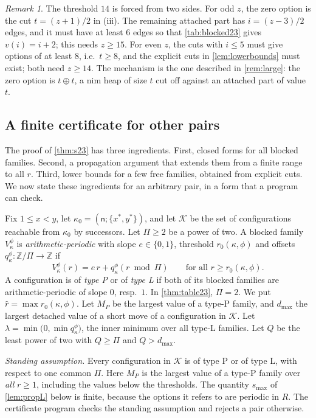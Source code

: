 \documentclass[11pt]{amsart}
\theoremstyle{definition}
\theoremstyle{remark}
\newtheorem{remark}[theorem]{Remark}
\newcommand{\sn}{\mathsf{n}}
\newcommand{\free}{\ast}
\begin{document}
\begin{remark}
The threshold $14$ is forced from two sides. For odd $z$, the zero option is the cut $t=(z+1)/2$ in (iii). The remaining attached part has $i=(z-3)/2$ edges, and it must have at least $6$ edges so that \cref{tab:blocked23} gives $v(i)=i+2$; this needs $z\ge15$. For even $z$, the cuts with $i\le5$ must give options of at least $8$, i.e.\ $t\ge8$, and the explicit cuts in \cref{lem:lowerbounds} must exist; both need $z\ge14$. The mechanism is the one described in \cref{rem:large}: the zero option is $t\oplus t$, a nim heap of size $t$ cut off against an attached part of value~$t$.
\end{remark}


\subsection{A finite certificate for other pairs}\label{sec:cert}
The proof of \cref{thm:s23} has three ingredients. First, closed forms for all blocked families. Second, a propagation argument that extends them from a finite range to all $r$. Third, lower bounds for a few free families, obtained from explicit cuts. We now state these ingredients for an arbitrary pair, in a form that a program can check.

Fix $1\le x<y$, let $\kappa_0=(\sn;\{x^\free,y^\free\})$, and let $\mathcal K$ be the set of configurations reachable from $\kappa_0$ by successors. Let $\Pi\ge2$ be a power of two. A blocked family $V^\phi_\kappa$ is \emph{arithmetic-periodic} with slope $e\in\{0,1\}$, threshold $r_0(\kappa,\phi)$ and offsets $q^\phi_\kappa\colon\mathbb Z/\Pi\to\mathbb Z$ if
\[
  V^\phi_\kappa(r)=e\,r+q^\phi_\kappa(r\bmod\Pi)\qquad\text{for all }r\ge r_0(\kappa,\phi).
\]
A configuration is of \emph{type P} or of \emph{type L} if both of its blocked families are arithmetic-periodic of slope $0$, resp.\ $1$. In \cref{thm:table23}, $\Pi=2$. We put $\hat r=\max r_0(\kappa,\phi)$. Let $M_P$ be the largest value of a type-P family, and $d_{\max}$ the largest detached value of a short move of a configuration in $\mathcal K$. Let $\lambda=\min\bigl(0,\min q^\phi_\kappa\bigr)$, the inner minimum over all type-L families. Let $Q$ be the least power of two with $Q\ge\Pi$ and $Q>d_{\max}$.

\emph{Standing assumption.} Every configuration in $\mathcal K$ is of type P or of type L, with respect to one common $\Pi$. Here $M_P$ is the largest value of a type-P family over \emph{all} $r\ge1$, including the values below the thresholds. The quantity $s_{\max}$ of \cref{lem:propL} below is finite, because the options it refers to are periodic in $R$. The certificate program checks the standing assumption and rejects a pair otherwise.
\end{document}
